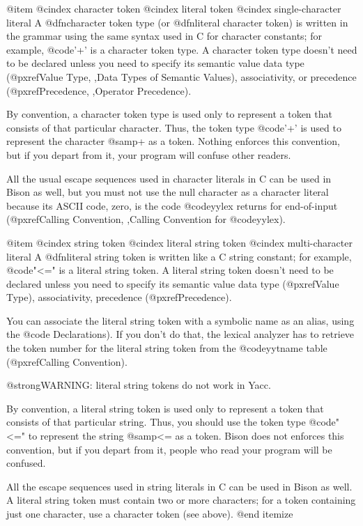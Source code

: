 {{{{{{{{{{{{{{{{{{@item
@cindex character token
@cindex literal token
@cindex single-character literal
A @dfn{character token type} (or @dfn{literal character token}) is
written in the grammar using the same syntax used in C for character
constants; for example, @code{'+'} is a character token type.  A
character token type doesn't need to be declared unless you need to
specify its semantic value data type (@pxref{Value Type, ,Data Types of
Semantic Values}), associativity, or precedence (@pxref{Precedence,
,Operator Precedence}).

By convention, a character token type is used only to represent a
token that consists of that particular character.  Thus, the token
type @code{'+'} is used to represent the character @samp{+} as a
token.  Nothing enforces this convention, but if you depart from it,
your program will confuse other readers.

All the usual escape sequences used in character literals in C can be
used in Bison as well, but you must not use the null character as a
character literal because its ASCII code, zero, is the code @code{yylex}
returns for end-of-input (@pxref{Calling Convention, ,Calling Convention
for @code{yylex}}).

@item
@cindex string token
@cindex literal string token
@cindex multi-character literal
A @dfn{literal string token} is written like a C string constant; for
example, @code{"<="} is a literal string token.  A literal string token
doesn't need to be declared unless you need to specify its semantic
value data type (@pxref{Value Type}), associativity, precedence
(@pxref{Precedence}).

You can associate the literal string token with a symbolic name as an
alias, using the @code{%
Declarations}).  If you don't do that, the lexical analyzer has to
retrieve the token number for the literal string token from the
@code{yytname} table (@pxref{Calling Convention}).

@strong{WARNING}: literal string tokens do not work in Yacc.

By convention, a literal string token is used only to represent a token
that consists of that particular string.  Thus, you should use the token
type @code{"<="} to represent the string @samp{<=} as a token.  Bison
does not enforces this convention, but if you depart from it, people who
read your program will be confused.

All the escape sequences used in string literals in C can be used in
Bison as well.  A literal string token must contain two or more
characters; for a token containing just one character, use a character
token (see above).
@end itemize

}}}}}}}}}}}}}}}}}}

